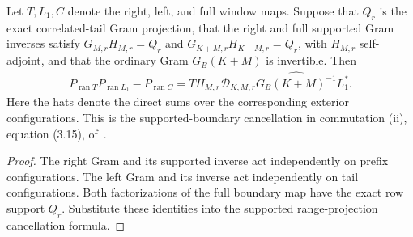 \begin{lemma}
    \label{thm:residual_window_supported_projector_cancellation}
    \leanok
    Let $T,L_1,C$ denote the right, left, and full window maps. Suppose that
    $Q_r$ is the exact correlated-tail Gram projection, that the right and full
    supported Gram inverses satisfy $G_{M,r}H_{M,r}=Q_r$ and
    $G_{K+M,r}H_{K+M,r}=Q_r$, with $H_{M,r}$ self-adjoint, and that the ordinary
    Gram $G_B(K+M)$ is invertible. Then
    \begin{align}
        P_{\operatorname{ran}T}P_{\operatorname{ran}L_1}-P_{\operatorname{ran}C}
        =T\widehat H_{M,r}\mathcal D_{K,M,r}
        \widehat {G_B(K+M)^{-1}}L_1^*.
    \end{align}
    Here the hats denote the direct sums over the corresponding exterior
    configurations. This is the supported-boundary cancellation in
    commutation (ii), equation (3.15), of~\cite{Nachtergaele1996Spectral}.
\end{lemma}
\begin{proof}\leanok
    The right Gram and its supported inverse act independently on prefix
    configurations. The left Gram and its inverse act independently on tail
    configurations. Both factorizations of the full boundary map have the exact
    row support $Q_r$. Substitute these identities into the supported
    range-projection cancellation formula.
\end{proof}

